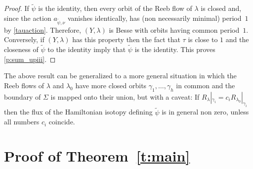 \begin{proof}
If $\tilde{\psi}$ is the identity, then every orbit of the Reeb flow of $\lambda$ is closed and, since the action $a_{\tilde{\psi},\nu}$ vanishes identically, has (non necessarily minimal) period~$1$ by \eqref{tauaction}. Therefore, $(Y,\lambda)$ is Besse with orbits having common period~$1$. Conversely, if $(Y,\lambda)$ has this property then the fact that $\tau$ is close to $1$ and the closeness of $\tilde\psi$ to the identity imply that $\tilde{\psi}$ is the identity. This proves \eqref{p:sum_upiii}.
\end{proof}

\begin{rem}
The above result can be generalized to a more general situation in which the Reeb flows of $\lambda$ and $\lambda_0$ have more closed orbits $\gamma_1, \dots,\gamma_h$ in common and the boundary of $\Sigma$ is mapped onto their union, but with a caveat: If $R_{\lambda}|_{\gamma_i} = c_i R_{\lambda_0}|_{\gamma_i}$ then the flux of the Hamiltonian isotopy defining
$\tilde{\psi}$ is in general non zero, unless all numbers $c_i$ coincide.
\end{rem}

\section{Proof of Theorem~\ref{t:main}}
\label{s:proof}

